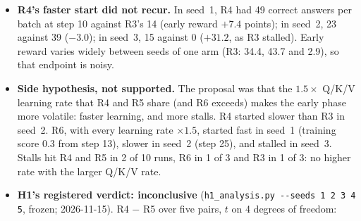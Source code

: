 \documentclass[11pt]{article}
\begin{document}
\begin{itemize}
\begin{itemize}
  \item \textbf{Seed~3.} With the same prompt order, three of the four INT8 arms stalled, while both BF16 runs learned at once (early reward: R3 2.9, R4 34.1, R5 0.1, R6 0.0; R1 37.1, R2 37.5).
  \item \textbf{Same start, different drifts.} In each stall the few correct answers of the first steps vanished within ten steps, and none returned for a long stretch. With no task reward in that stretch, nothing task-driven steers the policy. R5 seed~1 and R3 seed~3 drifted far from the reference model with rising entropy; R5 seed~3 and R6 seed~3 stayed near it at first.
  \item \textbf{No collapse.} All four recovered. The lowest late accuracy is R5 seed~1's 11.8\%, above the 10\% threshold.
  \end{itemize}
\item \textbf{R4's faster start did not recur.} In seed~1, R4 had 49 correct answers per batch at step 10 against R3's 14 (early reward $+7.4$ points); in seed~2, 23 against 39 ($-3.0$); in seed~3, 15 against 0 ($+31.2$, as R3 stalled). Early reward varies widely between seeds of one arm (R3: 34.4, 43.7 and 2.9), so that endpoint is noisy.
\item \textbf{Side hypothesis, not supported.} The proposal was that the $1.5\times$ Q/K/V learning rate that R4 and R5 share (and R6 exceeds) makes the early phase more volatile: faster learning, and more stalls. R4 started slower than R3 in seed~2. R6, with every learning rate $\times1.5$, started fast in seed~1 (training score 0.3 from step 13), slower in seed~2 (step 25), and stalled in seed~3. Stalls hit R4 and R5 in 2 of 10 runs, R6 in 1 of 3 and R3 in 1 of 3: no higher rate with the larger Q/K/V rate.
\item \textbf{H1's registered verdict: inconclusive} (\texttt{h1\_analysis.py -{}-seeds 1 2 3 4 5}, frozen; 2026-11-15). R4 $-$ R5 over five pairs, $t$ on 4 degrees of freedom:


\end{itemize}
\end{document}
